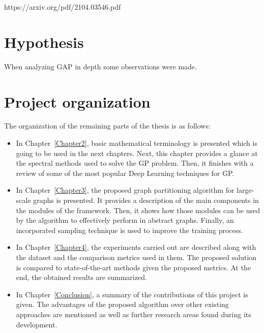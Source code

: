 https://arxiv.org/pdf/2104.03546.pdf
\section{Hypothesis}
When analyzing GAP in depth some observations were made.

\section{Project organization}

The organization of the remaining parts of the thesis is as follows:
\begin{itemize}
    \item In Chapter~\ref{Chapter2}, basic mathematical terminology is presented which is going to be used in the next chapters. Next, this chapter provides a glance at the spectral methods used to solve the GP problem. Then, it finishes with a review of some of the most popular Deep Learning techniques for GP.
    
    \item In Chapter~\ref{Chapter3}, the proposed graph partitioning algorithm for large-scale graphs is presented. It provides a description of the main components in the modules of the framework. Then, it shows how those modules can be used by the algorithm to effectively perform in abstract graphs. Finally, an incorporated sampling technique is used to improve the training process.
    
    \item In Chapter~\ref{Chapter4}, the experiments carried out are described along with the dataset and the comparison metrics used in them. The proposed solution is compared to state-of-the-art methods given the proposed metrics. At the end, the obtained results are summarized.
    
    \item In Chapter~\ref{Conclusion}, a summary of the contributions of this project is given. The advantages of the proposed algorithm over other existing approaches are mentioned as well as further research areas found during its development.
\end{itemize}

